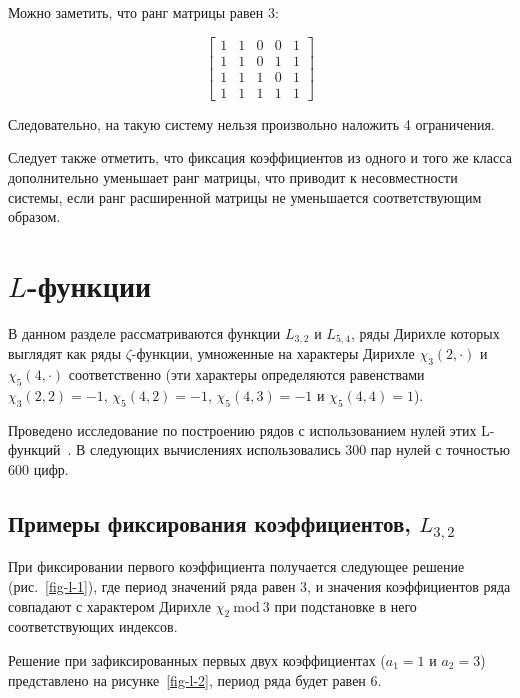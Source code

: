 \documentclass[intlimits,twoside,a4paper,11pt]{article}
\begin{document}
    Можно заметить, что ранг матрицы равен 3:

    \begin{equation}
        \begin{bmatrix}
            1 & 1 & 0 & 0 & 1 \\
            1 & 1 & 0 & 1 & 1 \\
            1 & 1 & 1 & 0 & 1 \\
            1 & 1 & 1 & 1 & 1
        \end{bmatrix}
    \end{equation}

    Следовательно, на такую систему нельзя произвольно наложить 4 ограничения.

    Следует также отметить, что фиксация коэффициентов из одного и того же класса дополнительно 
    уменьшает ранг матрицы, что приводит к несовместности системы, если ранг расширенной 
    матрицы не уменьшается соответствующим образом.


    \section{$L$-функции}

    В данном разделе рассматриваются функции $L_{3,2}$ и $L_{5,4}$, ряды Дирихле которых выглядят как ряды $\zeta$-функции,
    умноженные на характеры Дирихле $\chi_3(2,\cdot)$ и $\chi_5(4,\cdot)$ соответственно (эти характеры определяются равенствами 
    $\chi_3(2,2)=-1$, $\chi_5(4,2)=-1$, $\chi_5(4,3)=-1$ и $\chi_5(4,4)=1$).
    
    Проведено исследование по построению рядов с 
    использованием нулей этих L-функций~\cite{bizouard11}. В следующих вычислениях использовались 300 пар нулей с точностью 600 цифр. 

    \subsection{Примеры фиксирования коэффициентов, $L_{3,2}$}
    
    При фиксировании первого коэффициента получается следующее решение (рис.~\ref{fig-l-1}), 
    где период значений ряда равен 3, и значения коэффициентов ряда совпадают с характером Дирихле $\chi_2\ \mathrm{mod}\ 3$ 
    при подстановке в него соответствующих индексов.

    Решение при зафиксированных первых двух коэффициентах ($a_1=1$ и $a_2=3$) представлено на рисунке~\ref{fig-l-2}, период ряда будет равен 6.
\end{document}
